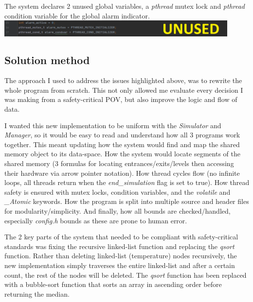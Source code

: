 \documentclass[a4paper]{article}
\begin{document}
\par \noindent The system declares 2 unused global variables, a \emph{pthread} mutex lock and \emph{pthread} condition variable for the global alarm indicator. \\[1\baselineskip]
\includegraphics[width=12.12cm]{report-img/other-problem-4.png}

\subsection{Solution method}

\par The approach I used to address the issues highlighted above, was to rewrite the whole program from scratch. This not only allowed me evaluate every decision I was making from a safety-critical POV, but also improve the logic and flow of data.

\newpage
\par I wanted this new implementation to be uniform with the \emph{Simulator} and \emph{Manager}, so it would be easy to read and understand how all 3 programs work together. This meant updating how the system would find and map the shared memory object to its data-space. How the system would locate segments of the shared memory (3 formulas for locating entrances/exits/levels then accessing their hardware via arrow pointer notation). How thread cycles flow (no infinite loops, all threads return when the \emph{end\_simulation} flag is set to true). How thread safety is ensured with mutex locks, condition variables, and the \emph{volatile} and \emph{\_Atomic} keywords. How the program is split into multiple source and header files for modularity/simplicity. And finally, how all bounds are checked/handled, especially \emph{config.h} bounds as these are prone to human error.

\par The 2 key parts of the system that needed to be compliant with safety-critical standards was fixing the recursive linked-list function and replacing the \emph{qsort} function. Rather than deleting linked-list (temperature) nodes recursively, the new implementation simply traverses the entire linked-list and after a certain count, the rest of the nodes will be deleted. The \emph{qsort} function has been replaced with a bubble-sort function that sorts an array in ascending order before returning the median.
\end{document}
